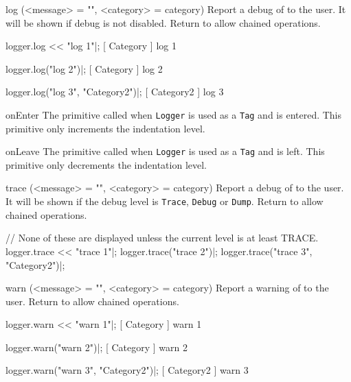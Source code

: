 \begin{urbiscriptapi}
\item[log](<message> = "", <category> = category)%
  Report a debug  of  to the user. It will be
  shown if debug is not disabled. Return \this to allow chained operations.
\begin{urbiscript}
logger.log << "log 1"|;
[       Category        ] log 1

logger.log("log 2")|;
[       Category        ] log 2

logger.log("log 3", "Category2")|;
[       Category2       ] log 3
\end{urbiscript}

\item[onEnter]%
  The primitive called when \lstinline|Logger| is used as a \lstinline|Tag|
  and is entered. This primitive only increments the indentation level.

\item[onLeave]%
  The primitive called when \lstinline|Logger| is used as a \lstinline|Tag|
  and is left. This primitive only decrements the indentation level.

\item[trace](<message> = "", <category> = category)%
  Report a debug  of  to the user. It will be
  shown if the debug level is \lstinline|Trace|, \lstinline|Debug| or
  \lstinline|Dump|. Return \this to allow chained operations.
\begin{urbiscript}
// None of these are displayed unless the current level is at least TRACE.
logger.trace << "trace 1"|;
logger.trace("trace 2")|;
logger.trace("trace 3", "Category2")|;
\end{urbiscript}

\item[warn](<message> = "", <category> = category)%
  Report a warning  of  to the user. Return \this
  to allow chained operations.
\begin{urbiscript}
logger.warn << "warn 1"|;
[       Category        ] warn 1

logger.warn("warn 2")|;
[       Category        ] warn 2

logger.warn("warn 3", "Category2")|;
[       Category2       ] warn 3
\end{urbiscript}
\end{urbiscriptapi}

